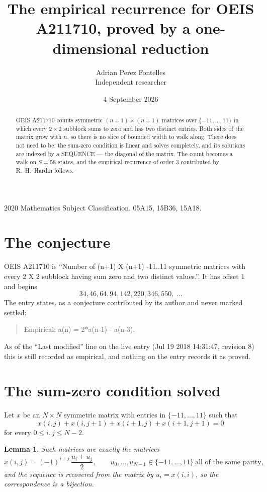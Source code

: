\documentclass[11pt,a4paper]{article}
\title{The empirical recurrence for OEIS A211710, proved by a one-dimensional reduction}
\author{Adrian Perez Fontelles\\ \small Independent researcher}
\date{4 September 2026}
\theoremstyle{plain}
\newtheorem{lemma}[theorem]{Lemma}
\theoremstyle{definition}
\begin{document}
\maketitle

\begin{abstract}
OEIS A211710 counts symmetric $(n+1)\times(n+1)$ matrices over
$\{-11,\dots,11\}$ in which every $2\times2$ subblock sums to zero and has two distinct
entries. Both sides of the matrix grow with $n$, so there is no slice of bounded width to walk
along. There does not need to be: the sum-zero condition is linear and solves completely, and
its solutions are indexed by a SEQUENCE --- the diagonal of the matrix. The count becomes a walk
on $S=58$ states, and the empirical recurrence of order $3$ contributed by R.~H.~Hardin
follows.
\end{abstract}

\noindent\small 2020 Mathematics Subject Classification. 05A15, 15B36, 15A18.\normalsize

\section{The conjecture}

OEIS A211710 is ``Number of (n+1) X (n+1) -11..11 symmetric matrices with every 2 X 2 subblock having sum zero and two distinct values.''. It has offset $1$ and begins
\[
34, 46, 64, 94, 142, 220, 346, 550,\ \dots
\]
The entry states, as a conjecture contributed by its author and never marked settled:
\begin{quote}
Empirical: a(n) = 2*a(n-1) - a(n-3).
\end{quote}
As of the ``Last modified'' line on the live entry (Jul 19 2018 14:31:47, revision 8) this is still
recorded as empirical, and nothing on the entry records it as proved.

\section{The sum-zero condition solved}

Let $x$ be an $N\times N$ symmetric matrix with entries in $\{-11,\dots,11\}$ such that
\[
x(i,j)+x(i,j{+}1)+x(i{+}1,j)+x(i{+}1,j{+}1)=0
\]
for every $0\le i,j\le N-2$.

\begin{lemma}\label{lem:solve}
Such matrices are exactly the matrices
\[
x(i,j)=(-1)^{i+j}\,\frac{u_i+u_j}{2},
\qquad u_0,\dots,u_{N-1}\in\{-11,\dots,11\}\ \text{all of the same parity},
\]
and the sequence is recovered from the matrix by $u_i=x(i,i)$, so the correspondence is a
bijection.
\end{lemma}
\end{document}
